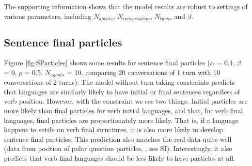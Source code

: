 \documentclass[12pt]{article}
\begin{document}
The supporting information shows that the model results are robust to settings of various parameters, including $N_{agents}$, $N_{conversation}$, $N_{turns}$ and $\beta$.


%
%


\subsection{Sentence final particles}

Figure \ref{fig:SParticles} shows some results for sentence final particles ($\alpha$ = 0.1, $\beta$ = 0, $p$ = 0.5, $N_{agents}$ = 10, comparing 20 conversations of 1 turn with 10 conversations of 2 turns).  The model without turn taking constraints predicts that languages are similarly likely to have initial or final sentences regardless of verb position.  However, with the constraint we see two things: Initial particles are more likely than final particles for verb initial languages, and that, for verb final languages, final particles are proportionately more likely. That is, if a language happens to settle on verb final structures, it is also more likely to develop sentence final particles.  This prediction also matches the real data quite well (data from position of polar question particles, \citealp{wals-92}, see SI).  Interestingly, it also predicts that verb final languages should be less likely to have particles at all.
\end{document}
